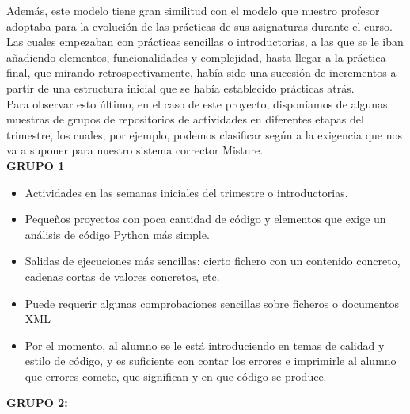 Además, este modelo tiene gran similitud con el modelo que nuestro profesor adoptaba para la evolución de las prácticas de sus asignaturas durante el curso. Las cuales empezaban con prácticas sencillas o introductorias, a las que se le iban añadiendo elementos, funcionalidades y complejidad, hasta llegar a la práctica final, que mirando retrospectivamente, había sido una sucesión de incrementos a partir de una estructura inicial que se había establecido prácticas atrás.\\


Para observar esto último, en el caso de este proyecto, disponíamos de algunas muestras de grupos de repositorios de actividades en diferentes etapas del trimestre, los cuales, por ejemplo, podemos clasificar según a la exigencia que nos va a suponer para nuestro sistema corrector Misture.\\

\textbf{GRUPO 1}


\begin{itemize}
\item Actividades en las semanas iniciales del trimestre o introductorias.\\

\item Pequeños proyectos con poca cantidad de código y elementos que exige un análisis de código Python más simple.\\

\item Salidas de ejecuciones más sencillas: cierto fichero con un contenido concreto, cadenas cortas de valores concretos, etc.\\

\item Puede requerir algunas comprobaciones sencillas sobre ficheros o documentos XML\\

\item Por el momento, al alumno se le está introduciendo en temas de calidad y estilo de código, y es suficiente con contar los errores e imprimirle al alumno que errores comete, que significan y en que código se produce.\\
\end{itemize}


\textbf{GRUPO 2:}


